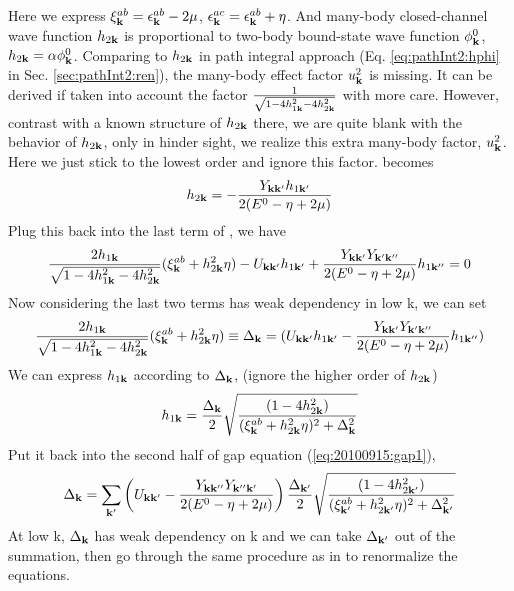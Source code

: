 Here we express $\xi^{ab}_{\mathbf{k}}=\epsilon^{ab}_{\mathbf{k}}-2\mu$, $\epsilon^{ac}_{\mathbf{k}}=\epsilon^{ab}_{\mathbf{k}}+\eta$.  And many-body closed-channel wave function $h_{2\mathbf{k}}$ is proportional to two-body bound-state wave function $\phi_{\mathbf{k}}^{0}$,  $h_{2\mathbf{k}}=\alpha\phi^{0}_{\mathbf{k}}$.  Comparing to $h_{2\mathbf{k}}$ in path integral approach (Eq. \ref{eq:pathInt2:hphi} in Sec. \ref{sec:pathInt2:ren}), the many-body effect factor $u_{\mathbf{k}}^{2}$ is missing.  It can be derived if taken into account the factor $\frac{1}{{\sqrt{1-4 h_{1\mathbf{k}}^2-4 h_{2\mathbf{k}}^2}}}$ with more care.  However, contrast with a known structure of $h_{2\mathbf{k}}$ there, we are quite blank with the behavior of $h_{2\mathbf{k}}$, only in hinder sight, we realize this extra many-body factor, $u_{\mathbf{k}}^{2}$.   Here we just stick to the lowest order and ignore this factor.  
 becomes
\begin{equation}\label{eq:20100915:GF}
h_{2\mathbf{k}}=-\frac{Y_{\mathbf{k}\mathbf{k}'}h_{1\mathbf{k}'}}{2(E^{0}-\eta+2\mu)}
\end{equation}
Plug this back into the last term of , we have 
\begin{equation}
\frac{2h_{1\mathbf{k}}}{\sqrt{1-4 h_{1\mathbf{k}}^2-4 h_{2\mathbf{k}}^2}} (\xi^{ab}_{\mathbf{k}}+  h_{2\mathbf{k}}^2\eta)-U_{\mathbf{k}\mathbf{k}'}h_{1\mathbf{k}'}+\frac{Y_{\mathbf{k}\mathbf{k}'}Y_{\mathbf{k}'\mathbf{k}''}}{2(E^{0}-\eta+2\mu)}h_{1\mathbf{k}''}=0
\end{equation}
Now considering the last two terms has weak dependency in low k, we can set 
\begin{equation}\label{eq:20100915:gap1}
\frac{2h_{1\mathbf{k}}}{\sqrt{1-4 h_{1\mathbf{k}}^2-4 h_{2\mathbf{k}}^2}} (\xi^{ab}_{\mathbf{k}}+  h_{2\mathbf{k}}^2\eta)\equiv\Delta_{\mathbf{k}}=(U_{\mathbf{k}\mathbf{k}'}h_{1\mathbf{k}'}-\frac{Y_{\mathbf{k}\mathbf{k}'}Y_{\mathbf{k}'\mathbf{k}''}}{2(E^{0}-\eta+2\mu)}h_{1\mathbf{k}''})
\end{equation}
We can express $h_{1\mathbf{k}}$ according to $\Delta_{\mathbf{k}}$,  (ignore the higher order of $h_{2\mathbf{k}}$)
\begin{equation}\label{eq:20100915:F}
h_{1\mathbf{k}}=\frac{\Delta_{\mathbf{k}}}2\sqrt{\frac{(1-4h_{2\mathbf{k}}^{2})}{(\xi^{ab}_{\mathbf{k}}+  h_{2\mathbf{k}}^2\eta)^{2}+\Delta_{\mathbf{k}}^{2}}}
\end{equation}
Put it back into the second half of gap equation (\ref{eq:20100915:gap1}), 
\begin{equation}\label{eq:20100915:onechannel}
\Delta_{\mathbf{k}}=\sum_{\mathbf{k}'}\left(U_{\mathbf{k}\mathbf{k}'}-\frac{Y_{\mathbf{k}\mathbf{k}''}Y_{\mathbf{k}''\mathbf{k}'}}{2(E^{0}-\eta+2\mu)}\right)\frac{\Delta_{\mathbf{k}'}}2\sqrt{\frac{(1-4h_{2\mathbf{k}'}^{2})}{(\xi^{ab}_{\mathbf{k}'}+  h_{2\mathbf{k}'}^2\eta)^{2}+\Delta_{\mathbf{k}'}^{2}}}
\end{equation}
At low k, $\Delta_{\mathbf{k}}$ has weak dependency on k and we can take $\Delta_{\mathbf{k}'}$ out of the summation,  then go through the same procedure as in \cite{Leggett,Fetter} to renormalize the equations. 

